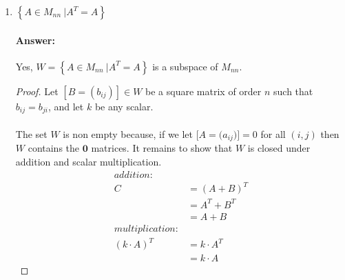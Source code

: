 \documentclass[12pt]{article}
\newcommand{\DS} [1] {${\displaystyle #1}$}
\begin{document}
\begin{enumerate}
\begin{enumerate}
\begin{proof}
\begin{align*}
                                                            & = 0
                                    \end{align*}
                                    To be clear, if we take some $C = A+B$ such that A and B are in $W$,
                                    then for all $C = (c_{ii})$, the sum will be $0$, so $C$ is also in $W$.
                                    Therefore $W$ is a subspace of $M_{nn}$.
                            \end{proof}
                      \item \DS{ \left\{A \in{M_{nn}} \ | A^T = A \right\}}
                            \paragraph{Answer:} Yes, $W={ \left\{A \in{M_{nn}} \ |
                                    A^T = A \right\}}$ is a subspace of $M_{nn}$.
                            \begin{proof}
                                    Let $[B = (b_{ij})]\in W$ be a square matrix of order $n$
                                    such that $b_{ij} = b_{ji}$, and let ${k}$ be any scalar.\\\\
                                    The set $W$ is non empty because, if we let $[A=({a_{ij})]=0}$
                                    for all $(i,j)$ then $W$ contains the $\mathbf{0}$ matrices.
                                    It remains to show that $W$ is closed under addition and scalar multiplication.
                                    \begin{align*}
                                            addition:       &                \\
                                            C               & = (A+B)^T      \\
                                                            & = A^T+B^T      \\
                                                            & = A + B        \\
                                            multiplication: &                \\
                                            (k\cdot A)^{T}  & = k\cdot A^{T} \\
                                                            & = k\cdot A
                                    \end{align*}


\end{proof}
\end{enumerate}
\end{enumerate}
\end{document}
